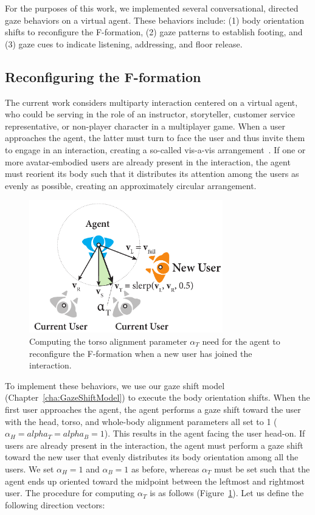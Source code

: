 For the purposes of this work, we implemented several conversational, directed gaze behaviors on a virtual agent. These behaviors include: (1) body orientation shifts to reconfigure the F-formation, (2) gaze patterns to establish footing, and (3) gaze cues to indicate listening, addressing, and floor release.

\subsection{Reconfiguring the F-formation}

The current work considers multiparty interaction centered on a virtual agent, who could be serving in the role of an instructor, storyteller, customer service representative, or non-player character in a multiplayer game. When a user approaches the agent, the latter must turn to face the user and thus invite them to engage in an interaction, creating a so-called vis-a-vis arrangement~\cite{kendon1990conducting}. If one or more avatar-embodied users are already present in the interaction, the agent must reorient its body such that it distributes its attention among the users as evenly as possible, creating an approximately circular arrangement.

\begin{figure}
\centering
\includegraphics[width=0.75\textwidth]{conversationalrolegaze/Figures/FTorsoAlign.pdf}
\caption{Computing the torso alignment parameter $\alpha_T$ need for the agent to reconfigure the F-formation when a new user has joined the interaction.}
\label{fig:FTorsoAlign}
\end{figure}

To implement these behaviors, we use our gaze shift model (Chapter~\ref{cha:GazeShiftModel}) to execute the body orientation shifts. When the first user approaches the agent, the agent performs a gaze shift toward the user with the head, torso, and whole-body alignment parameters all set to 1 ($\alpha_H = alpha_T = alpha_B = 1$). This results in the agent facing the user head-on. If users are already present in the interaction, the agent must perform a gaze shift toward the new user that evenly distributes its body orientation among all the users. We set $\alpha_H = 1$ and $\alpha_B = 1$ as before, whereas $\alpha_T$ must be set such that the agent ends up oriented toward the midpoint between the leftmost and rightmost user. The procedure for computing $\alpha_T$ is as follows (Figure~\ref{fig:FTorsoAlign}). Let us define the following direction vectors:


